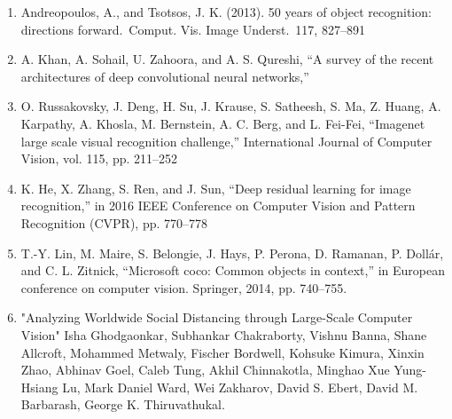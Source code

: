\begin{enumerate}
    \item Andreopoulos, A., and Tsotsos, J. K. (2013). 50 years of object recognition: directions forward. Comput. Vis. Image Underst. 117, 827–891
    
    \item A. Khan, A. Sohail, U. Zahoora, and A. S. Qureshi, “A survey of the recent architectures of deep convolutional neural networks,”
    
    \item O. Russakovsky, J. Deng, H. Su, J. Krause, S. Satheesh, S. Ma, Z. Huang, A. Karpathy, A. Khosla, M. Bernstein, A. C. Berg, and L. Fei-Fei, “Imagenet large scale visual recognition challenge,” International Journal of Computer Vision, vol. 115, pp. 211–252
    
    \item K. He, X. Zhang, S. Ren, and J. Sun, “Deep residual learning for image recognition,” in 2016 IEEE Conference on Computer Vision and Pattern Recognition (CVPR), pp. 770–778
    
    \item \label{itm:coco} T.-Y. Lin, M. Maire, S. Belongie, J. Hays, P. Perona, D. Ramanan,
    P. Dollár, and C. L. Zitnick, “Microsoft coco: Common objects in
    context,” in European conference on computer vision. Springer, 2014,
    pp. 740–755.

    \item \label{itm:last} "Analyzing Worldwide Social Distancing through Large-Scale Computer Vision" Isha Ghodgaonkar, Subhankar Chakraborty, Vishnu Banna, Shane Allcroft, Mohammed Metwaly, Fischer Bordwell, Kohsuke Kimura, Xinxin Zhao, Abhinav Goel, Caleb Tung, Akhil Chinnakotla, Minghao Xue Yung-Hsiang Lu, Mark Daniel Ward, Wei Zakharov, David S. Ebert, David M. Barbarash, George K. Thiruvathukal.
    

    



    
\end{enumerate}

\newpage